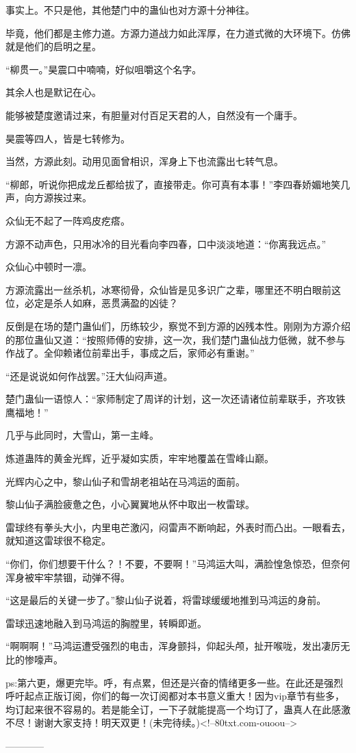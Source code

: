 \begin{this_body}
事实上。不只是他，其他楚门中的蛊仙也对方源十分神往。

毕竟，他们都是主修力道。方源力道战力如此浑厚，在力道式微的大环境下。仿佛就是他们的启明之星。

“柳贯一。”昊震口中喃喃，好似咀嚼这个名字。

其余人也是默记在心。

能够被楚度邀请过来，有胆量对付百足天君的人，自然没有一个庸手。

昊震等四人，皆是七转修为。

当然，方源此刻。动用见面曾相识，浑身上下也流露出七转气息。

“柳郎，听说你把成龙丘都给拔了，直接带走。你可真有本事！”李四春娇媚地笑几声，向方源挨过来。

众仙无不起了一阵鸡皮疙瘩。

方源不动声色，只用冰冷的目光看向李四春，口中淡淡地道：“你离我远点。”

众仙心中顿时一凛。

方源流露出一丝杀机，冰寒彻骨，众仙皆是见多识广之辈，哪里还不明白眼前这位，必定是杀人如麻，恶贯满盈的凶徒？

反倒是在场的楚门蛊仙们，历练较少，察觉不到方源的凶残本性。刚刚为方源介绍的那位蛊仙又道：“按照师傅的安排，这一次，我们楚门蛊仙战力低微，就不参与作战了。全仰赖诸位前辈出手，事成之后，家师必有重谢。”

“还是说说如何作战罢。”汪大仙闷声道。

楚门蛊仙一语惊人：“家师制定了周详的计划，这一次还请诸位前辈联手，齐攻铁鹰福地！”

几乎与此同时，大雪山，第一主峰。

炼道蛊阵的黄金光辉，近乎凝如实质，牢牢地覆盖在雪峰山巅。

光辉内心之中，黎山仙子和雪胡老祖站在马鸿运的面前。

黎山仙子满脸疲惫之色，小心翼翼地从怀中取出一枚雷球。

雷球终有拳头大小，内里电芒激闪，闷雷声不断响起，外表时而凸出。一眼看去，就知道这雷球很不稳定。

“你们，你们想要干什么？！不要，不要啊！”马鸿运大叫，满脸惶急惊恐，但奈何浑身被牢牢禁锢，动弹不得。

“这是最后的关键一步了。”黎山仙子说着，将雷球缓缓地推到马鸿运的身前。

雷球迅速地融入到马鸿运的胸膛里，转瞬即逝。

“啊啊啊！”马鸿运遭受强烈的电击，浑身颤抖，仰起头颅，扯开喉咙，发出凄厉无比的惨嚎声。

ps:第六更，爆更完毕。呼，有点累，但还是兴奋的情绪更多一些。在此还是强烈呼吁起点正版订阅，你们的每一次订阅都对本书意义重大！因为vip章节有些多，均订起来很不容易的。若是能全订，一下子就能提高一个均订了，蛊真人在此感激不尽！谢谢大家支持！明天双更！(未完待续。)<!--80txt.com-ouoou-->

------------

\end{this_body}

